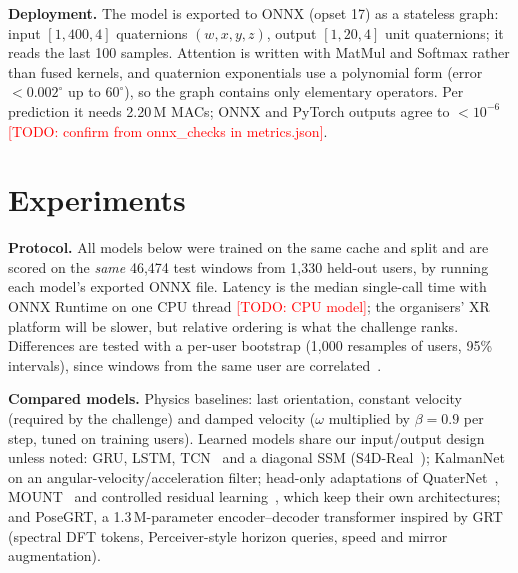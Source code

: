 \documentclass[conference]{IEEEtran}
\newcommand{\todo}[1]{\textcolor{red}{[TODO: #1]}}
\begin{document}
\textbf{Deployment.} The model is exported to ONNX (opset 17) as a stateless graph: input $[1,400,4]$ quaternions
$(w,x,y,z)$, output $[1,20,4]$ unit quaternions; it reads the last 100 samples. Attention is written with MatMul and Softmax
rather than fused kernels, and quaternion exponentials use a polynomial form (error $<0.002^\circ$ up to $60^\circ$), so the
graph contains only elementary operators. Per prediction it needs 2.20\,M MACs; ONNX and PyTorch outputs agree to
$<10^{-6}$ \todo{confirm from onnx\_checks in metrics.json}.

\section{Experiments}
\label{sec:results}
\textbf{Protocol.} All models below were trained on the same cache and split and are scored on the \emph{same} 46{,}474
test windows from 1{,}330 held-out users, by running each model's exported ONNX file. Latency is the median single-call time
with ONNX Runtime on one CPU thread \todo{CPU model}; the organisers' XR platform will be slower, but relative ordering is
what the challenge ranks. Differences are tested with a per-user bootstrap (1{,}000 resamples of users, 95\% intervals),
since windows from the same user are correlated~\cite{efron1993}.

\textbf{Compared models.} Physics baselines: last orientation, constant velocity (required by the challenge) and damped
velocity ($\omega$ multiplied by $\beta=0.9$ per step, tuned on training users). Learned models share our input/output design
unless noted: GRU, LSTM, TCN~\cite{bai2018} and a diagonal SSM (S4D-Real~\cite{gu2022s4d}); KalmanNet~\cite{revach2022} on an
angular-velocity/acceleration filter; head-only adaptations of QuaterNet~\cite{pavllo2018}, MOUNT~\cite{chen2024mount} and
controlled residual learning~\cite{yoon2022}, which keep their own architectures; and PoseGRT, a 1.3\,M-parameter
encoder--decoder transformer inspired by GRT~\cite{huang2025grt} (spectral DFT tokens, Perceiver-style horizon queries,
speed and mirror augmentation).
\end{document}
